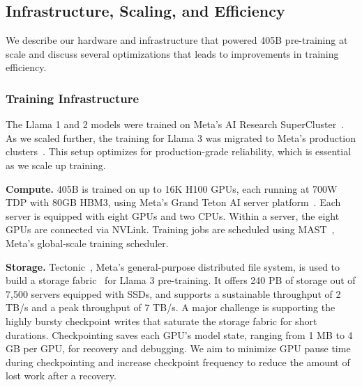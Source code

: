 \newcommand{\cq}[1]{\textcolor{red}{\{CQ: #1\}}} %

\subsection{Infrastructure, Scaling, and Efficiency}
\label{section:pretraining_model_scaling}
We describe our hardware and infrastructure that powered \llamathree 405B pre-training at scale and discuss several optimizations that leads to improvements in training efficiency.

\subsubsection{Training Infrastructure}
The Llama 1 and 2 models were trained on Meta's AI Research SuperCluster~\citep{Lee22RSC}. As we scaled further, the training for Llama 3 was migrated to Meta's production clusters~\citep{lee2024building}.%
This setup optimizes for production-grade reliability, which is essential as we scale up training.

\textbf{Compute.}
\llamathree 405B is trained on up to 16K H100 GPUs, each running at 700W TDP with 80GB HBM3, using Meta's Grand Teton AI server platform~\citep{various2022grandteton}. Each server is equipped with eight GPUs and two CPUs. Within a server, the eight GPUs are connected via NVLink. Training jobs are scheduled using MAST~\citep{choudhury2024mast}, Meta's global-scale training scheduler.

\textbf{Storage.} 
Tectonic~\citep{pan2021tectonicfs}, Meta's general-purpose distributed file system, is used to build a storage fabric~\citep{battey2024storage} for Llama 3 pre-training. It offers 240 PB of storage out of 7,500 servers equipped with SSDs, and supports a sustainable throughput of 2 TB/s and a peak throughput of 7 TB/s. A major challenge is supporting the highly bursty checkpoint writes that saturate the storage fabric for short durations. Checkpointing saves each GPU’s model state, ranging from 1 MB to 4 GB per GPU, for recovery and debugging. We aim to minimize GPU pause time during checkpointing and increase checkpoint frequency to reduce the amount of lost work after a recovery. 

